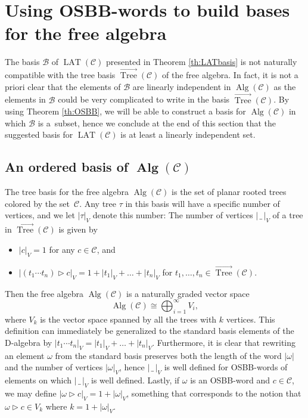 \documentclass[10pt,a4paper]{amsart}
\newcommand{\OT}{\operatorname{OT}}
\newcommand*{\LAT}{\operatorname{LAT}}
\newcommand*{\Alg}{\operatorname{Alg}}
\newcommand{\ord}[1]{\overrightarrow{#1}}
\renewcommand*{\OT}{\ord{\operatorname{Tree}}}
\newcommand{\noarg}{\,\_\,}
\numberwithin{equation}{section}
\begin{document}
\section{Using OSBB-words to build bases for the free algebra}\label{sec:bases}

The basis $\mathcal{B}$ of $\LAT(\mathcal{C})$ presented in Theorem \ref{th:LATbasis} is not naturally compatible with the tree basis $\OT(\mathcal{C})$ of the free algebra. In fact, it is not a priori clear that the elements of $\mathcal{B}$ are linearly independent in $\Alg(\mathcal{C})$ as the elements in $\mathcal{B}$ could be very complicated to write in the basis $\OT(\mathcal{C})$. By using Theorem \ref{th:OSBB}, we will be able to construct a basis for $\Alg(\mathcal{C})$ in which $\mathcal{B}$ is a~subset, hence we conclude at the end of this section that the suggested basis for $\LAT(\mathcal{C})$ is at least a linearly independent set.

\subsection[An ordered basis of Alg(C)]{An ordered basis of $\boldsymbol{\Alg(\mathcal{C})}$}%


The tree basis for the free algebra $\Alg(\mathcal{C})$ is the set of planar rooted trees colored by the set~$\mathcal{C}$. Any tree $\tau$ in this basis will have a specific number of vertices, and we let $|\tau|_V$ denote this number: The number of vertices $| \noarg |_V$ of a tree in $\OT(\mathcal{C})$ is given by
\begin{itemize}\itemsep=0pt
 \item $|c|_V=1$ for any $c \in \mathcal{C}$, and
 \item $|(t_1 \cdots t_n) \rhd c|_V = 1 + |t_1|_V + \dots + |t_n|_V$ for $t_1 , \dots , t_n \in \OT(\mathcal{C})$.
\end{itemize}


Then the free algebra $\Alg(\mathcal{C})$ is a naturally graded vector space
\[
\Alg(\mathcal{C}) \cong \bigoplus_{i=1}^{\infty} V_i,
\]
where $V_k$ is the vector space spanned by all the trees with $k$ vertices. This definition can immediately be generalized to the standard basis elements of the D-algebra by $|t_1 \cdots t_n|_V = |t_1|_V + \dots + |t_n|_V$. Furthermore, it is clear that rewriting an element $\omega$ from the standard basis preserves both the length of the word $|\omega|$ and the number of vertices $|\omega|_V$, hence $|\noarg|_V$ is well defined for OSBB-words of elements on which $|\noarg|_V$ is well defined. Lastly, if $\omega$ is an OSBB-word and $c \in \mathcal{C}$, we may define $|\omega \rhd c|_V = 1+|\omega|_V$, something that corresponds to the notion that $\omega \rhd c \in V_k$ where $k = 1+ |\omega|_V$.
\end{document}
